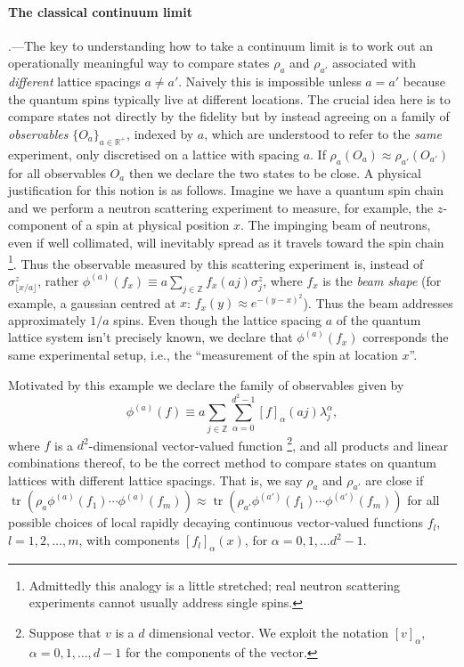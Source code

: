 \documentclass[prl,twocolumn,lengthcheck,superscriptaddress]{revtex4-1}
\newcommand{\tr}{\operatorname{tr}}
\theoremstyle{definition}
\theoremstyle{remark}
\begin{document}
\paragraph{The classical continuum limit}\hspace{-1em}.---The key to understanding how to take a continuum limit is to work out an operationally meaningful way to compare states $\rho_a$ and $\rho_{a'}$ associated with \emph{different} lattice spacings $a\not=a'$. Naively this is impossible unless $a=a'$ because the quantum spins typically live at different locations. The crucial idea here is to compare states not directly by the fidelity but by instead agreeing on a family of \emph{observables} $\{O_a\}_{a\in\mathbb{R}^+}$, indexed by $a$, which are understood to refer to the \emph{same} experiment, only discretised on a lattice with spacing $a$. If $\rho_a(O_a) \approx \rho_{a'}(O_{a'})$ for all observables $O_a$ then we declare the two states to be close. A physical justification for this notion is as follows. Imagine we have a quantum spin chain and we perform a neutron scattering experiment to measure, for example, the $z$-component of a spin at physical position $x$. The impinging beam of neutrons, even if well collimated, will inevitably spread as it travels toward the spin chain \footnote{Admittedly this analogy is a little stretched; real neutron scattering experiments cannot usually address single spins.}. Thus the observable measured by this scattering experiment is, instead of $\sigma^z_{\lfloor x/a \rfloor}$, rather $\phi^{(a)}(f_x) \equiv a\sum_{j\in\mathbb{Z}} f_x(aj) \sigma_j^z$, where $f_x$ is the \emph{beam shape} (for example, a gaussian centred at $x$: $f_x(y) \approx e^{-(y-x)^2}$). Thus the beam addresses approximately $1/a$ spins. Even though the lattice spacing $a$ of the quantum lattice system isn't precisely known, we declare that $\phi^{(a)}(f_x)$ corresponds the same experimental setup, i.e., the ``measurement of the spin at location $x$''. 

Motivated by this example we declare the family of observables given by
\begin{equation}
	\phi^{(a)}(f) \equiv a\sum_{j\in\mathbb{Z}} \sum_{\alpha=0}^{d^2-1} [f]_\alpha(aj) \lambda_j^\alpha,
\end{equation}
where $f$ is a $d^2$-dimensional vector-valued function \footnote{Suppose that $v$ is a $d$ dimensional vector. We exploit the notation $[v]_\alpha$, $\alpha=0,1,\ldots, d-1$ for the components of the vector.}, and all products and linear combinations thereof, to be the correct method to compare states on quantum lattices with different lattice spacings. That is, we say $\rho_a$ and $\rho_{a'}$ are close if $\tr(\rho_a \phi^{(a)}(f_1)\cdots \phi^{(a)}(f_m)) \approx \tr(\rho_{a'} \phi^{(a')}(f_1)\cdots \phi^{(a')}(f_m))$ for all possible choices of local rapidly decaying continuous vector-valued functions $f_l$, $l= 1, 2, \ldots, m$, with components $[f_l]_{\alpha}(x)$, for $\alpha = 0, 1, \ldots d^2-1$. 
\end{document}
